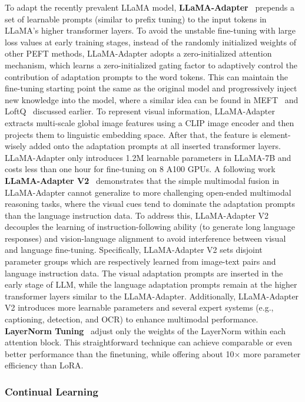 To adapt the recently prevalent LLaMA model, \textbf{LLaMA-Adapter}~\cite{zhang2023llama} prepends a set of learnable prompts (similar to prefix tuning) to the input tokens in LLaMA’s higher transformer layers. To avoid the unstable fine-tuning with large loss values at early training stages, instead of the randomly initialized weights of other PEFT methods, LLaMA-Adapter adopts a zero-initialized attention mechanism, which learns a zero-initialized gating factor to adaptively control the contribution of adaptation prompts to the word tokens. This can maintain the fine-tuning starting point the same as the original model and progressively inject new knowledge into the model, where a similar idea can be found in MEFT~\cite{liao2023make} and LoftQ~\cite{loftq} discussed earlier. To represent visual information, LLaMA-Adapter extracts multi-scale global image features using a CLIP image encoder and then projects them to linguistic embedding space. After that, the feature is element-wisely added onto the adaptation prompts at all inserted transformer layers. LLaMA-Adapter only introduces 1.2M learnable parameters in LLaMA-7B and costs less than one hour for fine-tuning on 8 A100 GPUs.
A following work \textbf{LLaMA-Adapter V2}~\cite{gao2023llama} demonstrates that the simple multimodal fusion in LLaMA-Adapter cannot generalize to more challenging open-ended multimodal reasoning tasks, where the visual cues tend to dominate the adaptation prompts than the language instruction data. To address this, LLaMA-Adapter V2 decouples the learning of instruction-following ability (to generate long language responses) and vision-language alignment to avoid interference between visual and language fine-tuning. Specifically, LLaMA-Adapter V2 sets disjoint parameter groups which are respectively learned from image-text pairs and language instruction data. The visual adaptation prompts are inserted in the early stage of LLM, while the language adaptation prompts remain at the higher transformer layers similar to the LLaMA-Adapter. Additionally, LLaMA-Adapter V2 introduces more learnable parameters and several expert systems (e.g., captioning, detection, and OCR) to enhance multimodal performance. 
\textbf{LayerNorm Tuning}~\cite{zhao2023tuning} adjust only the weights of the LayerNorm within each attention block. This straightforward technique can achieve comparable or even better performance than the
finetuning, while offering about 10× more parameter efficiency than LoRA.


\subsubsection{Continual Learning}

